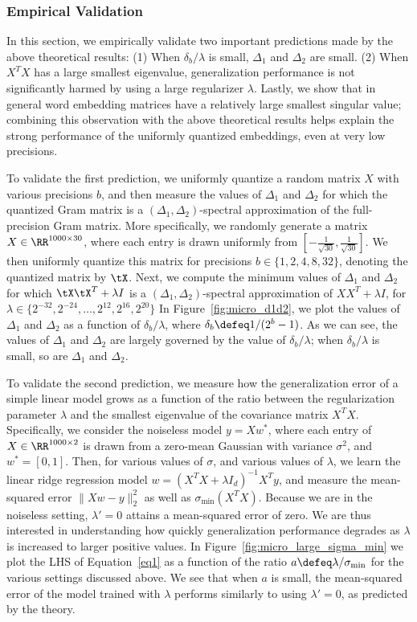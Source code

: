 \subsubsection{Empirical Validation}
\label{sec:theory_validation}
In this section, we empirically validate two important predictions made by the above theoretical results: (1) When $\delta_b/\lambda$ is small, $\Delta_1$ and $\Delta_2$ are small. (2) When $X^T X$ has a large smallest eigenvalue, generalization performance is not significantly harmed by using a large regularizer $\lambda$.
Lastly, we show that in general word embedding matrices have a relatively large smallest singular value;
combining this observation with the above theoretical results helps explain the strong performance of the uniformly quantized embeddings, even at very low precisions.

To validate the first prediction, we uniformly quantize a random matrix $X$ with various precisions $b$, and then measure the values of $\Delta_1$ and $\Delta_2$ for which the quantized Gram matrix is a $(\Delta_1,\Delta_2)$-spectral approximation of the full-precision Gram matrix.
More specifically, we randomly generate a matrix $X \in \RR^{1000 \times 30}$, where each entry is drawn uniformly from $[-\frac{1}{\sqrt{30}},\frac{1}{\sqrt{30}}]$.
We then uniformly quantize this matrix for precisions $b \in \{1,2,4,8,32\}$, denoting the quantized matrix by $\tX$.
Next, we compute the minimum values of $\Delta_1$ and $\Delta_2$ for which $\tX\tX^T + \lambda I$ is a $(\Delta_1,\Delta_2)$-spectral approximation of $XX^T + \lambda I$, for $\lambda \in \{2^{-32}, 2^{-24}, \ldots, 2^{12}, 2^{16}, 2^{20}\}$ 
In Figure~\ref{fig:micro_d1d2}, we plot the values of $\Delta_1$ and $\Delta_2$ as a function of $\delta_b/\lambda$, where $\delta_b \defeq 1/(2^b-1)$.
As we can see, the values of $\Delta_1$ and $\Delta_2$ are largely governed by the value of $\delta_b/\lambda$; when $\delta_b/\lambda$ is small, so are $\Delta_1$ and $\Delta_2$.

To validate the second prediction, we measure how the generalization error of a simple linear model grows as a function of the ratio between the regularization parameter $\lambda$ and the smallest eigenvalue of the covariance matrix $X^T X$.
Specifically, we consider the noiseless model $y = Xw^*$, where each entry of $X \in \RR^{1000 \times 2}$ is drawn from a zero-mean Gaussian with variance $\sigma^2$, and $w^*=[0,1]$.
Then, for various values of $\sigma$, and various values of $\lambda$, we learn the linear ridge regression model $w = (X^T X + \lambda I_d)^{-1}X^Ty$, and measure the mean-squared error $\|Xw-y\|_2^2$ as well as $\sigma_{\min}(X^T X)$.
Because we are in the noiseless setting, $\lambda'=0$ attains a mean-squared error of zero.
We are thus interested in understanding how quickly generalization performance degrades as $\lambda$ is increased to larger positive values.
In Figure~\ref{fig:micro_large_sigma_min} we plot the LHS of Equation~\eqref{eq1} as a function of the ratio $a \defeq \lambda/\sigma_{\min}$ for the various settings discussed above.
We see that when $a$ is small, the mean-squared error of the model trained with $\lambda$ performs similarly to using $\lambda'=0$, as predicted by the theory.

